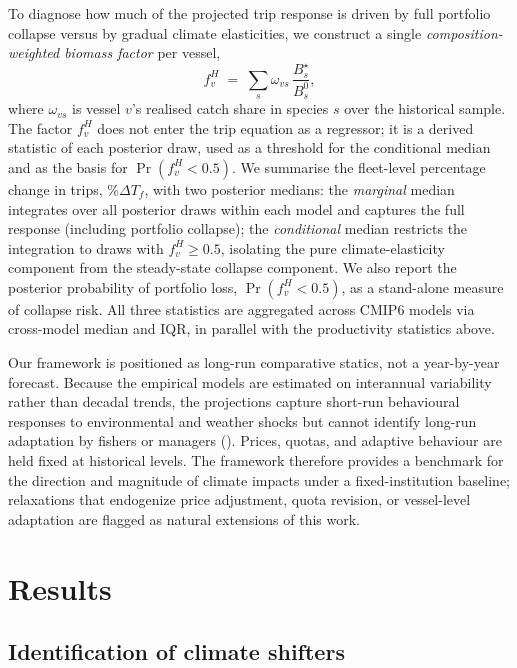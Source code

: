 \documentclass[
  11pt,
]{article}
\begin{document}
To diagnose how much of the projected trip response is driven by full portfolio collapse versus by gradual climate elasticities, we construct a single \emph{composition-weighted biomass factor} per vessel,
\begin{equation}
f^H_v \;=\; \sum_s \omega_{vs}\,\frac{B_s^{\star}}{B_s^{0}}, \label{eq:fHv}
\end{equation}
where \(\omega_{vs}\) is vessel \(v\)'s realised catch share in species \(s\) over the historical sample. The factor \(f^H_v\) does not enter the trip equation as a regressor; it is a derived statistic of each posterior draw, used as a threshold for the conditional median and as the basis for \(\Pr(f^H_v<0.5)\). We summarise the fleet-level percentage change in trips, \(\%\Delta T_f\), with two posterior medians: the \emph{marginal} median integrates over all posterior draws within each model and captures the full response (including portfolio collapse); the \emph{conditional} median restricts the integration to draws with \(f^H_v \geq 0.5\), isolating the pure climate-elasticity component from the steady-state collapse component. We also report the posterior probability of portfolio loss, \(\Pr(f^H_v<0.5)\), as a stand-alone measure of collapse risk. All three statistics are aggregated across CMIP6 models via cross-model median and IQR, in parallel with the productivity statistics above.

Our framework is positioned as long-run comparative statics, not a year-by-year forecast. Because the empirical models are estimated on interannual variability rather than decadal trends, the projections capture short-run behavioural responses to environmental and weather shocks but cannot identify long-run adaptation by fishers or managers (). Prices, quotas, and adaptive behaviour are held fixed at historical levels. The framework therefore provides a benchmark for the direction and magnitude of climate impacts under a fixed-institution baseline; relaxations that endogenize price adjustment, quota revision, or vessel-level adaptation are flagged as natural extensions of this work.

\section{Results}\label{results}

\subsection{Identification of climate shifters}\label{identification}
\end{document}
